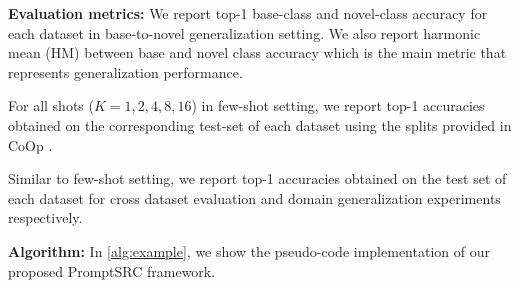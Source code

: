\documentclass[10pt,twocolumn,letterpaper]{article}
\begin{document}
\noindent  \textbf{{Evaluation metrics:}}
We report top-1 base-class and novel-class accuracy for each dataset in base-to-novel generalization setting. We also report harmonic mean (HM) between base and novel class accuracy which is the main metric that represents generalization performance.

For all shots ($K=1, 2, 4, 8, 16$) in few-shot setting, we report top-1 accuracies obtained on the corresponding test-set of each dataset using the splits provided in CoOp \cite{zhou2022learning}. 

Similar to few-shot setting, we report top-1 accuracies obtained on the test set of each dataset for cross dataset evaluation and domain generalization experiments respectively.

\noindent  \textbf{{Algorithm:}}
In \autoref{alg:example}, we show the pseudo-code implementation of our proposed PromptSRC framework.
\end{document}

